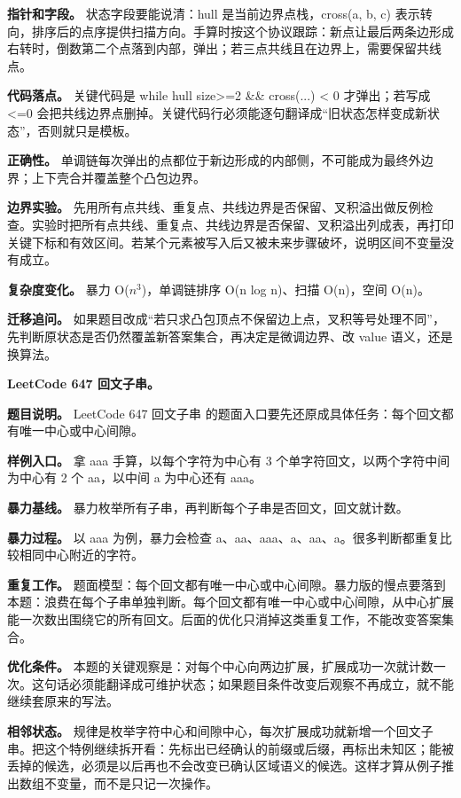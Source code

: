 \textbf{指针和字段。} 状态字段要能说清：hull 是当前边界点栈，cross(a, b, c) 表示转向，排序后的点序提供扫描方向。手算时按这个协议跟踪：新点让最后两条边形成右转时，倒数第二个点落到内部，弹出；若三点共线且在边界上，需要保留共线点。

\textbf{代码落点。} 关键代码是 while hull size>=2 \&\& cross(...) < 0 才弹出；若写成 <=0 会把共线边界点删掉。关键代码行必须能逐句翻译成“旧状态怎样变成新状态”，否则就只是模板。

\textbf{正确性。} 单调链每次弹出的点都位于新边形成的内部侧，不可能成为最终外边界；上下壳合并覆盖整个凸包边界。

\textbf{边界实验。} 先用所有点共线、重复点、共线边界是否保留、叉积溢出做反例检查。实验时把所有点共线、重复点、共线边界是否保留、叉积溢出列成表，再打印关键下标和有效区间。若某个元素被写入后又被未来步骤破坏，说明区间不变量没有成立。

\textbf{复杂度变化。} 暴力 O(\ensuremath{n^{3}})，单调链排序 O(n log n)、扫描 O(n)，空间 O(n)。

\textbf{迁移追问。} 如果题目改成“若只求凸包顶点不保留边上点，叉积等号处理不同”，先判断原状态是否仍然覆盖新答案集合，再决定是微调边界、改 value 语义，还是换算法。

\noindent\textbf{LeetCode 647 回文子串。}

\textbf{题目说明。} LeetCode 647 回文子串 的题面入口要先还原成具体任务：每个回文都有唯一中心或中心间隙。

\textbf{样例入口。} 拿 aaa 手算，以每个字符为中心有 3 个单字符回文，以两个字符中间为中心有 2 个 aa，以中间 a 为中心还有 aaa。

\textbf{暴力基线。} 暴力枚举所有子串，再判断每个子串是否回文，回文就计数。

\textbf{暴力过程。} 以 aaa 为例，暴力会检查 a、aa、aaa、a、aa、a。很多判断都重复比较相同中心附近的字符。

\textbf{重复工作。} 题面模型：每个回文都有唯一中心或中心间隙。暴力版的慢点要落到本题：浪费在每个子串单独判断。每个回文都有唯一中心或中心间隙，从中心扩展能一次数出围绕它的所有回文。后面的优化只消掉这类重复工作，不能改变答案集合。

\textbf{优化条件。} 本题的关键观察是：对每个中心向两边扩展，扩展成功一次就计数一次。这句话必须能翻译成可维护状态；如果题目条件改变后观察不再成立，就不能继续套原来的写法。

\textbf{相邻状态。} 规律是枚举字符中心和间隙中心，每次扩展成功就新增一个回文子串。把这个特例继续拆开看：先标出已经确认的前缀或后缀，再标出未知区；能被丢掉的候选，必须是以后再也不会改变已确认区域语义的候选。这样才算从例子推出数组不变量，而不是只记一次操作。

